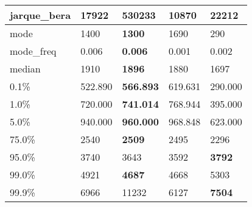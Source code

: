 \begin{table}[H]
\begin{tabular}{|l|m{10em}|m{10em}|m{10em}|m{10em}|}
\hline jarque\_bera & 17922 & \cellcolor[rgb]{0.9, 0.54, 0.52} 530233 & 10870 & \bfseries 22212 \\
\hline mode & 1400 & \bfseries 1300 & 1690 & \cellcolor[rgb]{0.9, 0.54, 0.52} 290 \\
\hline mode\_freq & 0.006 & \bfseries 0.006 & \cellcolor[rgb]{0.9, 0.54, 0.52} 0.001 & 0.002 \\
\hline median & 1910 & \bfseries 1896 & 1880 & \cellcolor[rgb]{0.9, 0.54, 0.52} 1697 \\
\hline 0.1\% & 522.890 & \bfseries 566.893 & 619.631 & \cellcolor[rgb]{0.9, 0.54, 0.52} 290.000 \\
\hline 1.0\% & 720.000 & \bfseries 741.014 & 768.944 & \cellcolor[rgb]{0.9, 0.54, 0.52} 395.000 \\
\hline 5.0\% & 940.000 & \bfseries 960.000 & 968.848 & \cellcolor[rgb]{0.9, 0.54, 0.52} 623.000 \\
\hline 75.0\% & 2540 & \bfseries 2509 & 2495 & \cellcolor[rgb]{0.9, 0.54, 0.52} 2296 \\
\hline 95.0\% & 3740 & 3643 & \cellcolor[rgb]{0.9, 0.54, 0.52} 3592 & \bfseries 3792 \\
\hline 99.0\% & 4921 & \bfseries 4687 & 4668 & \cellcolor[rgb]{0.9, 0.54, 0.52} 5303 \\
\hline 99.9\% & 6966 & \cellcolor[rgb]{0.9, 0.54, 0.52} 11232 & 6127 & \bfseries 7504 \\
\hline
\end{tabular}
\end{table}
